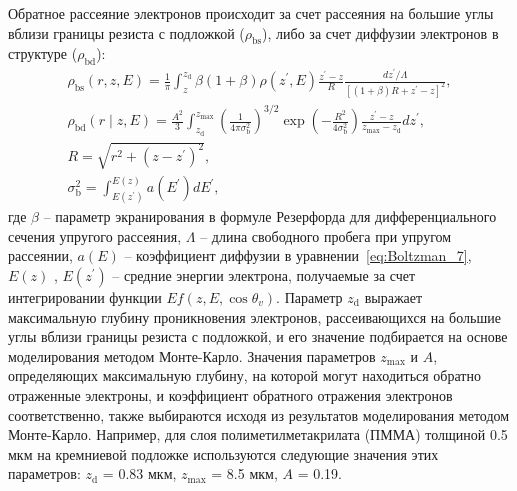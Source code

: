 Обратное рассеяние электронов происходит за счет рассеяния на большие углы вблизи границы резиста с подложкой ($\rho_\mathrm{bs}$), либо за счет диффузии электронов в структуре ($\rho_\mathrm{bd}$):
\begin{equation} \label{eq:Boltzman_12}
	\begin{gathered}
		\rho_\mathrm{bs}(r, z, E)=\frac{1}{\pi} \int_z^{z_\mathrm{d}} \beta(1+\beta) \rho\left(z^{\prime}, E\right) \frac{z^{\prime}-z}{R} \frac{d z^{\prime} / \Lambda}{\left[(1+\beta) R+z^{\prime}-z\right]^2}, \\
		\rho_\mathrm{bd}(r \mid z, E)=\frac{A^2}{3} \int_{z_\mathrm{d}}^{z_\mathrm{max}}\left(\frac{1}{4 \pi \sigma_\mathrm{b}^2}\right)^{3 / 2} \exp \left(-\frac{R^2}{4 \sigma_\mathrm{b}^2}\right) \frac{z^{\prime}-z}{z_{\max }-z_\mathrm{d}} d z^{\prime},\\
		R=\sqrt{r^2+\left(z-z^{\prime}\right)^2}, \\ \sigma_\mathrm{b}^2=\int_{E\left(z^{\prime}\right)}^{E(z)} a\left(E^{\prime}\right) d E^{\prime},
	\end{gathered}
\end{equation}
где $\beta$ -- параметр экранирования в формуле Резерфорда для дифференциального сечения упругого рассеяния, $\Lambda$ -- длина свободного пробега при упругом рассеянии, $a(E)$ -- коэффициент диффузии в уравнении~\ref{eq:Boltzman_7}, $E(z)$ , $E(z^\prime)$ -- средние энергии электрона, получаемые за счет интегрировании функции $Ef(z, E, \cos \theta_v )$. Параметр $z_\mathrm{d}$ выражает максимальную глубину проникновения электронов, рассеивающихся на большие углы вблизи границы резиста с подложкой, и его значение подбирается на основе моделирования методом Монте-Карло. Значения параметров $z_\mathrm{max}$ и $A$, определяющих максимальную глубину, на которой могут находиться обратно отраженные электроны, и коэффициент обратного отражения электронов соответственно, также выбираются исходя из результатов моделирования методом Монте-Карло. Например, для слоя полиметилметакрилата (ПММА) толщиной 0.5 мкм на кремниевой подложке используются следующие значения этих параметров: $z_\mathrm{d}$ = 0.83 мкм, $z_\mathrm{max}$ = 8.5 мкм, $A$ = 0.19.


